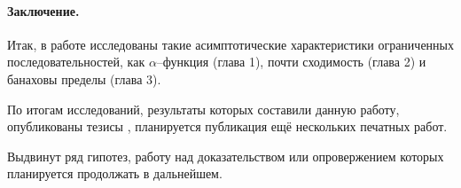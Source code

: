 \documentclass[a4paper,openbib]{report}
\begin{document}
\paragraph{Заключение.}
Итак, в работе исследованы такие асимптотические характеристики ограниченных последовательностей,
как $\alpha$--функция (глава 1),  почти сходимость (глава 2) и банаховы пределы (глава 3).


По итогам исследований, результаты которых составили данную работу,
опубликованы тезисы \cite{our-vvmsh-2018,our-vzms-2018,our-ped-2018-inf-dim-ker,our-ped-2018-alpha-Tx},
планируется публикация ещё нескольких печатных работ.

Выдвинут ряд гипотез,
работу над доказательством или опровержением которых планируется продолжать в дальнейшем.

\printbibliography{}
\end{document}
